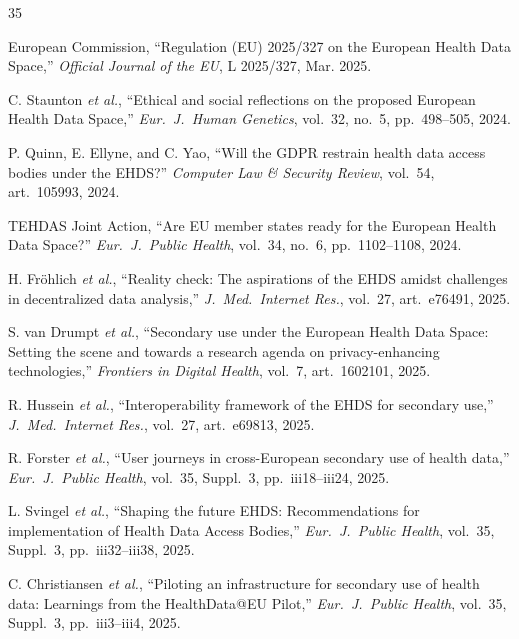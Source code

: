 \documentclass[conference,letterpaper]{IEEEtran}
\begin{document}
\begin{thebibliography}{35}

European Commission, ``Regulation (EU) 2025/327 on the European Health Data Space,'' \textit{Official Journal of the EU}, L 2025/327, Mar. 2025.

C. Staunton \textit{et al.}, ``Ethical and social reflections on the proposed European Health Data Space,'' \textit{Eur.~J.~Human Genetics}, vol.~32, no.~5, pp.~498--505, 2024.

P. Quinn, E. Ellyne, and C. Yao, ``Will the GDPR restrain health data access bodies under the EHDS?'' \textit{Computer Law \& Security Review}, vol.~54, art.~105993, 2024.

TEHDAS Joint Action, ``Are EU member states ready for the European Health Data Space?'' \textit{Eur.~J.~Public Health}, vol.~34, no.~6, pp.~1102--1108, 2024.

H. Fr\"ohlich \textit{et al.}, ``Reality check: The aspirations of the EHDS amidst challenges in decentralized data analysis,'' \textit{J.~Med.~Internet Res.}, vol.~27, art.~e76491, 2025.

S. van Drumpt \textit{et al.}, ``Secondary use under the European Health Data Space: Setting the scene and towards a research agenda on privacy-enhancing technologies,'' \textit{Frontiers in Digital Health}, vol.~7, art.~1602101, 2025.

R. Hussein \textit{et al.}, ``Interoperability framework of the EHDS for secondary use,'' \textit{J.~Med.~Internet Res.}, vol.~27, art.~e69813, 2025.

R. Forster \textit{et al.}, ``User journeys in cross-European secondary use of health data,'' \textit{Eur.~J.~Public Health}, vol.~35, Suppl.~3, pp.~iii18--iii24, 2025.

L. Svingel \textit{et al.}, ``Shaping the future EHDS: Recommendations for implementation of Health Data Access Bodies,'' \textit{Eur.~J.~Public Health}, vol.~35, Suppl.~3, pp.~iii32--iii38, 2025.

C. Christiansen \textit{et al.}, ``Piloting an infrastructure for secondary use of health data: Learnings from the HealthData@EU Pilot,'' \textit{Eur.~J.~Public Health}, vol.~35, Suppl.~3, pp.~iii3--iii4, 2025.


\end{thebibliography}
\end{document}
